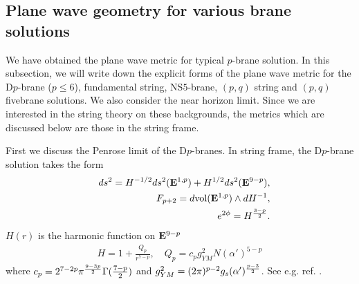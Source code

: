 \documentclass[a4paper,12pt]{article}
\begin{document}
\subsection{Plane wave geometry for various brane solutions}

We have obtained the plane wave  metric 
for typical $p$-brane solution.
In this subsection, we will write down the explicit forms 
of the plane wave
metric for the D$p$-brane ($p\le 6$), fundamental string,
NS$5$-brane, $(p,q)$ string and $(p,q)$ fivebrane solutions. 
We also consider the near horizon limit.
Since we are interested in the string theory on these backgrounds,  
the metrics which are discussed below are those in the string frame.



\vspace{2mm}
\vspace{1mm}

First we discuss the Penrose limit of the D$p$-branes.
In string frame, the D$p$-brane solution takes the form
\cite{HoSt}
\begin{eqnarray}
&&ds^2=H^{-1/2}ds^2({\bf E}^{1,p})+H^{1/2}ds^2({\bf E}^{9-p}), \nonumber  \\
&&F_{p+2}=d{\rm vol}({\bf E}^{1,p})\wedge dH^{-1}, \nonumber \\
&&e^{2\phi}=H^{\frac{3-p}{2}}.
\end{eqnarray}
$H(r)$ is the harmonic function on ${\bf E}^{9-p}$
\begin{eqnarray}
H=1+\frac{Q_p}{r^{7-p}}, \quad Q_{p}=c_{p}g_{YM}^{2}N(\alpha')^{5-p}
\end{eqnarray}
where $c_{p}=2^{7-2p}\pi^{{9-3p\over2}}\Gamma({7-p\over2})$ and
$g_{YM}^2=(2\pi)^{p-2}g_{s}(\alpha')^{{p-3\over2}}$. 
See e.g. ref. \cite{IzMaSoYa}.
\end{document}
